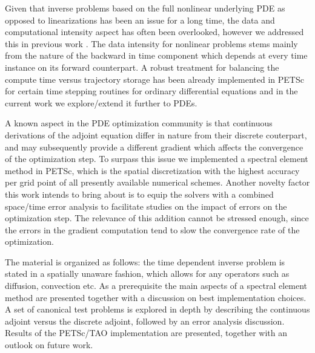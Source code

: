 \documentclass[10pt]{article}
\begin{document}
Given that inverse problems based on the full nonlinear underlying PDE as opposed to linearizations has been an issue for a long time, the data and computational intensity aspect has often been overlooked, however we addressed this in previous work \cite{schanen_2016}. The data intensity for nonlinear problems stems mainly from the nature of the backward in time component which depends at every time instance on its forward counterpart. A robust treatment for balancing the compute time versus trajectory storage has been already implemented in PETSc for certain time stepping routines for ordinary differential equations and in the current work we explore/extend it further to PDEs. 

A known aspect in the PDE optimization community is that continuous derivations of the adjoint equation differ in nature from their discrete couterpart, and may subsequently provide a different gradient which affects the convergence of the optimization step. To surpass this issue we implemented a spectral element method in PETSc, which is the spatial discretization with the highest accuracy per grid point of all presently available numerical schemes. Another novelty factor this work intends to bring about is to equip the solvers with a combined space/time error analysis to facilitate studies on the impact of errors on the optimization step. The relevance of this addition cannot be stressed enough, since the errors in the gradient computation tend to slow the convergence rate of the optimization.

The material is organized as follows: the time dependent inverse problem is stated in a spatially unaware fashion, which allows for any operators such as diffusion, convection etc. As a prerequisite the main aspects of a spectral element method are presented together with a discussion on best implementation choices. A set of canonical test problems is explored in depth by describing the continuous adjoint versus the discrete adjoint, followed by an error analysis discussion. Results of the PETSc/TAO implementation are presented, together with an outlook on future work.


  
\end{document}

